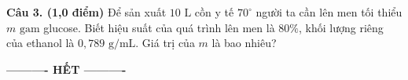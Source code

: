 \documentclass[11pt,a4paper]{article}
\begin{document}
\vspace{2pt}

\vspace{4pt}
\noindent
\textbf{Câu 3. (1,0 điểm)} Để sản xuất $10\text{ L}$ cồn y tế $70^\circ$ người ta cần lên men tối thiểu $m\text{ gam}$ glucose. Biết hiệu suất của quá trình lên men là $80\%$, khối lượng riêng của ethanol là $0,789\text{ g/mL}$. Giá trị của $m$ là bao nhiêu?

\vspace{2pt}

\vspace{8pt}
\begin{center}
\textbf{---------- HẾT ----------}
\end{center}
\end{document}
